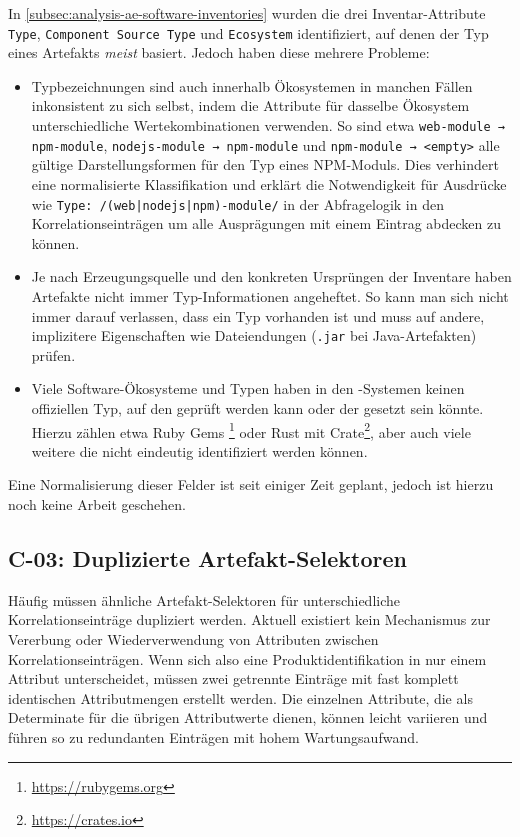 In \autoref{subsec:analysis-ae-software-inventories} wurden die drei Inventar-Attribute \texttt{Type}, \texttt{Component Source Type} und \texttt{Ecosystem} identifiziert, auf denen der Typ eines Artefakts \textit{meist} basiert.
Jedoch haben diese mehrere Probleme:

\begin{itemize}
    \item Typbezeichnungen sind auch innerhalb Ökosystemen in manchen Fällen inkonsistent zu sich selbst, indem die Attribute für dasselbe Ökosystem unterschiedliche Wertekombinationen verwenden.
    So sind etwa \texttt{web-module → npm-module}, \texttt{nodejs-module → npm-module} und \texttt{npm-module → <empty>} alle gültige Darstellungsformen für den Typ eines NPM-Moduls.
    Dies verhindert eine normalisierte Klassifikation und erklärt die Notwendigkeit für Ausdrücke wie \texttt{Type: /(web|nodejs|npm)-module/} in der Abfragelogik in den Korrelationseinträgen um alle Ausprägungen mit einem Eintrag abdecken zu können.

    \item Je nach Erzeugungsquelle und den konkreten Ursprüngen der Inventare haben Artefakte nicht immer Typ-Informationen angeheftet.
    So kann man sich nicht immer darauf verlassen, dass ein Typ vorhanden ist und muss auf andere, implizitere Eigenschaften wie Dateiendungen (\texttt{.jar} bei Java-Artefakten) prüfen.

    \item Viele Software-Ökosysteme und Typen haben in den \metaeffekt-Systemen keinen offiziellen Typ, auf den geprüft werden kann oder der gesetzt sein könnte.
    Hierzu zählen etwa Ruby Gems \footnote{\url{https://rubygems.org}} oder Rust mit Crate\footnote{\url{https://crates.io}}, aber auch viele weitere die nicht eindeutig identifiziert werden können.
\end{itemize}

Eine Normalisierung dieser Felder ist seit einiger Zeit geplant, jedoch ist hierzu noch keine Arbeit geschehen.

\subsection{C-03: Duplizierte Artefakt-Selektoren}\label{subsec:c-03-duplizierte-artefakt-selektoren}


Häufig müssen ähnliche Artefakt-Selektoren für unterschiedliche Korrelationseinträge dupliziert werden.
Aktuell existiert kein Mechanismus zur Vererbung oder Wiederverwendung von Attributen zwischen Korrelationseinträgen.
Wenn sich also eine Produktidentifikation in nur einem Attribut unterscheidet, müssen zwei getrennte Einträge mit fast komplett identischen Attributmengen erstellt werden.
Die einzelnen Attribute, die als Determinate für die übrigen Attributwerte dienen, können leicht variieren und führen so zu redundanten Einträgen mit hohem Wartungsaufwand.

